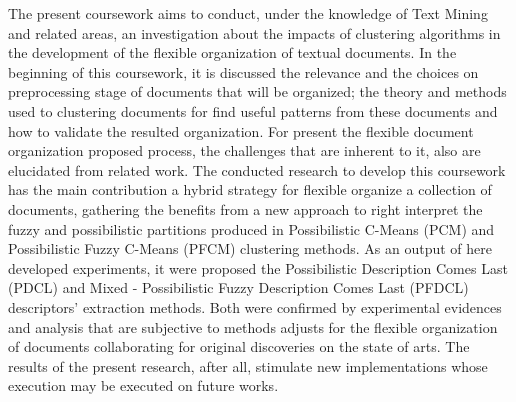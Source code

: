 The present coursework aims to conduct, under the knowledge of Text Mining and related areas, an
investigation about the impacts of clustering algorithms in the development of the flexible
organization of textual documents. In the beginning of this coursework, it is discussed the
relevance and the choices on  preprocessing stage of documents that will be organized; the theory
and methods used to clustering documents for find useful patterns from these documents and how to
validate the resulted organization. For present the flexible document organization proposed process,
the challenges that are inherent to it, also are elucidated from related work. 
The conducted research to develop this coursework has the main contribution a hybrid  strategy for
flexible organize a collection of documents, gathering the benefits from a new approach to right
interpret the fuzzy and possibilistic partitions produced in Possibilistic C-Means (PCM) and
Possibilistic Fuzzy C-Means (PFCM) clustering methods.
As an output of here developed experiments, it were proposed the Possibilistic Description Comes
Last (PDCL) and Mixed - Possibilistic Fuzzy Description Comes Last (PFDCL) descriptors' extraction
methods.  Both were confirmed by experimental evidences and analysis that are subjective to methods
adjusts for the flexible organization of documents collaborating for original discoveries on the
state of arts. The results of the present research, after all, stimulate new implementations whose
execution may be executed on future works.
